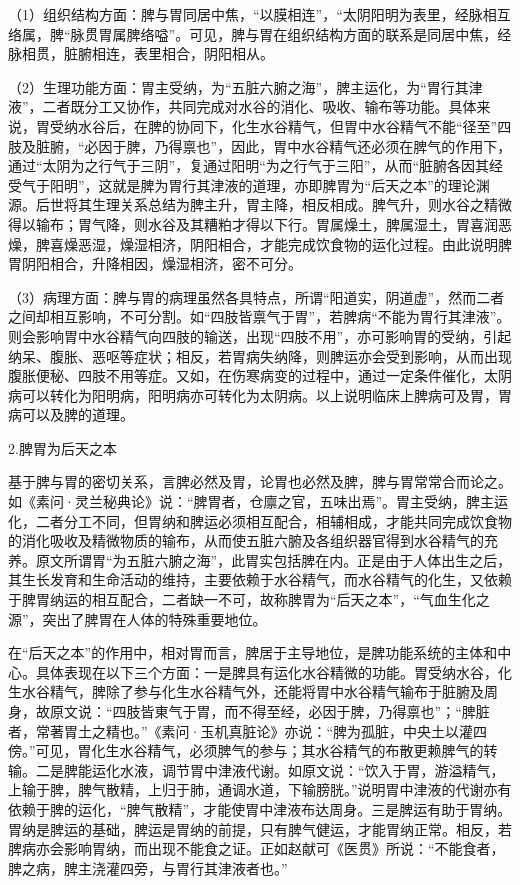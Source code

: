 \documentclass[12pt]{ctexbook}
\begin{document}
（1）组织结构方面：脾与胃同居中焦，“以膜相连”，“太阴阳明为表里，经脉相互络属，脾“脉贯胃属脾络嗌”。可见，脾与胃在组织结构方面的联系是同居中焦，经脉相贯，脏腑相连，表里相合，阴阳相从。

（2）生理功能方面：胃主受纳，为“五脏六腑之海”，脾主运化，为“胃行其津液”，二者既分工又协作，共同完成对水谷的消化、吸收、输布等功能。具体来说，胃受纳水谷后，在脾的协同下，化生水谷精气，但胃中水谷精气不能“径至”四肢及脏腑，“必因于脾，乃得禀也”，因此，胃中水谷精气还必须在脾气的作用下，通过“太阴为之行气于三阴”，复通过阳明“为之行气于三阳”，从而“脏腑各因其经受气于阳明”，这就是脾为胃行其津液的道理，亦即脾胃为“后天之本”的理论渊源。后世将其生理关系总结为脾主升，胃主降，相反相成。脾气升，则水谷之精微得以输布；胃气降，则水谷及其糟粕才得以下行。胃属燥土，脾属湿土，胃喜润恶燥，脾喜燥恶湿，燥湿相济，阴阳相合，才能完成饮食物的运化过程。由此说明脾胃阴阳相合，升降相因，燥湿相济，密不可分。

（3）病理方面：脾与胃的病理虽然各具特点，所谓“阳道实，阴道虚”，然而二者之间却相互影响，不可分割。如“四肢皆禀气于胃”，若脾病“不能为胃行其津液”。则会影响胃中水谷精气向四肢的输送，出现“四肢不用”，亦可影响胃的受纳，引起纳呆、腹胀、恶呕等症状；相反，若胃病失纳降，则脾运亦会受到影响，从而出现腹胀便秘、四肢不用等症。又如，在伤寒病变的过程中，通过一定条件催化，太阴病可以转化为阳明病，阳明病亦可转化为太阴病。以上说明临床上脾病可及胃，胃病可以及脾的道理。

2.脾胃为后天之本

基于脾与胃的密切关系，言脾必然及胃，论胃也必然及脾，脾与胃常常合而论之。如《素问·灵兰秘典论》说：“脾胃者，仓廪之官，五味出焉”。胃主受纳，脾主运化，二者分工不同，但胃纳和脾运必须相互配合，相辅相成，才能共同完成饮食物的消化吸收及精微物质的输布，从而使五脏六腑及各组织器官得到水谷精气的充养。原文所谓胃“为五脏六腑之海”，此胃实包括脾在内。正是由于人体出生之后，其生长发育和生命活动的维持，主要依赖于水谷精气，而水谷精气的化生，又依赖于脾胃纳运的相互配合，二者缺一不可，故称脾胃为“后天之本”，“气血生化之源”，突出了脾胃在人体的特殊重要地位。

在“后天之本”的作用中，相对胃而言，脾居于主导地位，是脾功能系统的主体和中心。具体表现在以下三个方面：一是脾具有运化水谷精微的功能。胃受纳水谷，化生水谷精气，脾除了参与化生水谷精气外，还能将胃中水谷精气输布于脏腑及周身，故原文说：“四肢皆東气于胃，而不得至经，必因于脾，乃得禀也”；“脾脏者，常著胃土之精也。”《素问·玉机真脏论》亦说：“脾为孤脏，中央土以灌四傍。”可见，胃化生水谷精气，必须脾气的参与；其水谷精气的布散更赖脾气的转输。二是脾能运化水液，调节胃中津液代谢。如原文说：“饮入于胃，游溢精气，上输于脾，脾气散精，上归于肺，通调水道，下输膀胱。”说明胃中津液的代谢亦有依赖于脾的运化，“脾气散精”，才能使胃中津液布达周身。三是脾运有助于胃纳。胃纳是脾运的基础，脾运是胃纳的前提，只有脾气健运，才能胃纳正常。相反，若脾病亦会影响胃纳，而出现不能食之证。正如赵献可《医贯》所说：“不能食者，脾之病，脾主浇灌四旁，与胃行其津液者也。”
\end{document}
